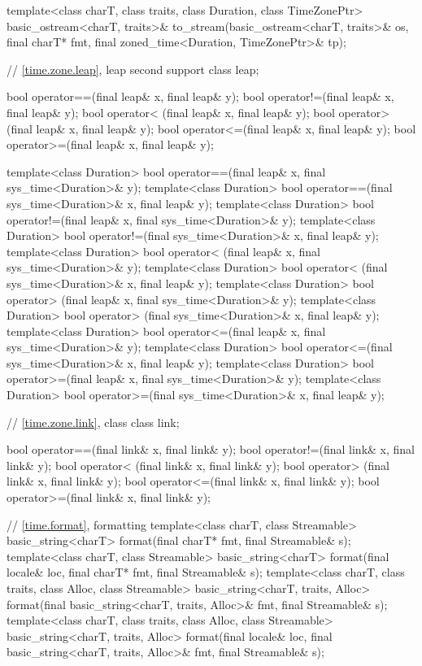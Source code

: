 \begin{codeblock}
{{    template<class charT, class traits, class Duration, class TimeZonePtr>
      basic_ostream<charT, traits>&
        to_stream(basic_ostream<charT, traits>& os, final charT* fmt,
                  final zoned_time<Duration, TimeZonePtr>& tp);

    // \ref{time.zone.leap}, leap second support
    class leap;

    bool operator==(final leap& x, final leap& y);
    bool operator!=(final leap& x, final leap& y);
    bool operator< (final leap& x, final leap& y);
    bool operator> (final leap& x, final leap& y);
    bool operator<=(final leap& x, final leap& y);
    bool operator>=(final leap& x, final leap& y);

    template<class Duration>
      bool operator==(final leap& x, final sys_time<Duration>& y);
    template<class Duration>
      bool operator==(final sys_time<Duration>& x, final leap& y);
    template<class Duration>
      bool operator!=(final leap& x, final sys_time<Duration>& y);
    template<class Duration>
      bool operator!=(final sys_time<Duration>& x, final leap& y);
    template<class Duration>
      bool operator< (final leap& x, final sys_time<Duration>& y);
    template<class Duration>
      bool operator< (final sys_time<Duration>& x, final leap& y);
    template<class Duration>
      bool operator> (final leap& x, final sys_time<Duration>& y);
    template<class Duration>
      bool operator> (final sys_time<Duration>& x, final leap& y);
    template<class Duration>
      bool operator<=(final leap& x, final sys_time<Duration>& y);
    template<class Duration>
      bool operator<=(final sys_time<Duration>& x, final leap& y);
    template<class Duration>
      bool operator>=(final leap& x, final sys_time<Duration>& y);
    template<class Duration>
      bool operator>=(final sys_time<Duration>& x, final leap& y);

    // \ref{time.zone.link}, class 
    class link;

    bool operator==(final link& x, final link& y);
    bool operator!=(final link& x, final link& y);
    bool operator< (final link& x, final link& y);
    bool operator> (final link& x, final link& y);
    bool operator<=(final link& x, final link& y);
    bool operator>=(final link& x, final link& y);

    // \ref{time.format}, formatting
    template<class charT, class Streamable>
      basic_string<charT>
        format(final charT* fmt, final Streamable& s);
    template<class charT, class Streamable>
      basic_string<charT>
        format(final locale& loc, final charT* fmt, final Streamable& s);
    template<class charT, class traits, class Alloc, class Streamable>
      basic_string<charT, traits, Alloc>
        format(final basic_string<charT, traits, Alloc>& fmt, final Streamable& s);
    template<class charT, class traits, class Alloc, class Streamable>
      basic_string<charT, traits, Alloc>
        format(final locale& loc, final basic_string<charT, traits, Alloc>& fmt,
               final Streamable& s);

}}
\end{codeblock}
